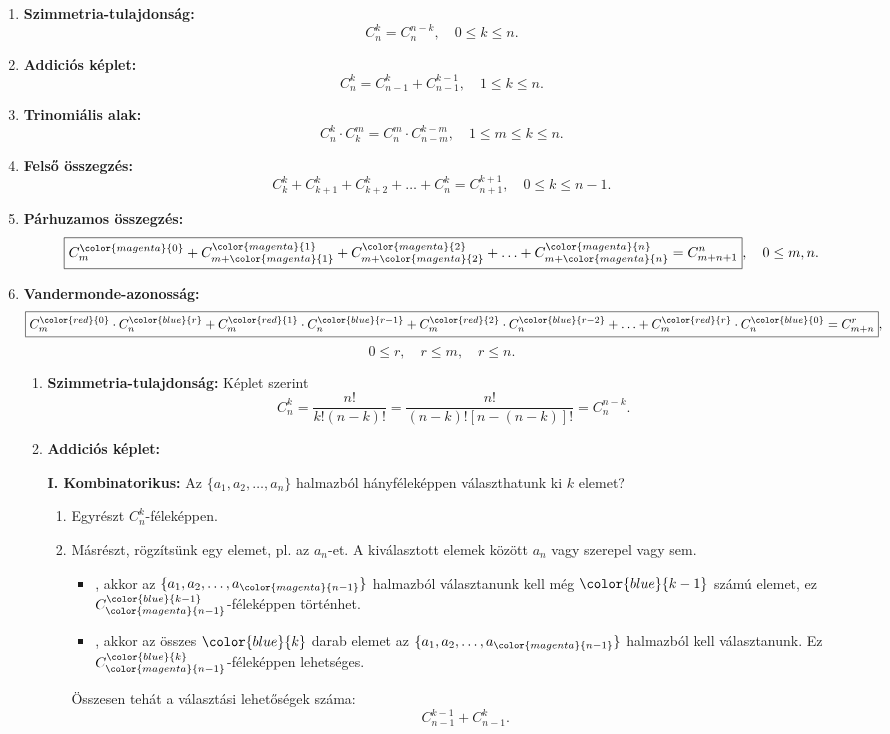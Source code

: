 \begin{enumerate}
\item \textbf{Szimmetria-tulajdonság:} 
\[
\boxed{C_{n}^{k}=C_{n}^{n-k}},\quad0\leq k\leq n.
\]
\item \textbf{Addiciós képlet:} 
\[
\boxed{C_{n}^{k}=C_{n-1}^{k}+C_{n-1}^{k-1}},\quad1\leq k\leq n.
\]
\item \textbf{Trinomiális alak:} 
\[
\boxed{C_{n}^{k}\cdot C_{k}^{m}=C_{n}^{m}\cdot C_{n-m}^{k-m}},\quad1\leq m\leq k\leq n.
\]
\item \textbf{Felső összegzés:} 
\[
\boxed{C_{k}^{k}+C_{k+1}^{k}+C_{k+2}^{k}+\ldots+C_{n}^{k}=C_{n+1}^{k+1}},\quad0\leq k\leq n-1.
\]
\item \textbf{Párhuzamos összegzés:} 
\[
\boxed{C_{m}^{{\color{magenta}{0}}}+C_{m+{\color{magenta}{1}}}^{{\color{magenta}{1}}}+C_{m+{\color{magenta}{2}}}^{{\color{magenta}{2}}}+\ldots+C_{m+{\color{magenta}{n}}}^{{\color{magenta}{n}}}=C_{m+n+1}^{n}},\quad0\leq m,n.
\]
\item \textbf{Vandermonde-azonosság:} 
\[
\boxed{C_{m}^{{\color{red}{0}}}\cdot C_{n}^{{\color{blue}{r}}}+C_{m}^{{\color{red}{1}}}\cdot C_{n}^{{\color{blue}{r-1}}}+C_{m}^{{\color{red}{2}}}\cdot C_{n}^{{\color{blue}{r-2}}}+\ldots+C_{m}^{{\color{red}{r}}}\cdot C_{n}^{{\color{blue}{0}}}=C_{m+n}^{r}},
\]
\[
0\leq r,\quad r\leq m,\quad r\leq n.
\]

\begin{enumerate}
\item \textbf{Szimmetria-tulajdonság:} Képlet szerint 
\[
C_{n}^{k}=\frac{n!}{k!(n-k)!}=\frac{n!}{(n-k)![n-(n-k)]!}=C_{n}^{n-k}.
\]
\item \textbf{Addiciós képlet:}

\textbf{I. Kombinatorikus:} Az $\{a_{1},a_{2},\dots,a_{n}\}$ halmazból
hányféleképpen választhatunk ki $k$ elemet? 
\begin{enumerate}
\item Egyrészt $C_{n}^{k}$-féleképpen. 
\item Másrészt, rögzítsünk egy elemet, pl. az $a_{n}$-et. A kiválasztott
elemek között $a_{n}$ vagy szerepel vagy sem. 
\begin{itemize}
\item {\color{ccqqqq}{Ha szerepel}}, akkor az $\{a_{1},a_{2},\dots,a_{{\color{magenta}{n-1}}}\}$
halmazból választanunk kell még ${\color{blue}{k-1}}$ számú elemet,
ez $C_{{\color{magenta}{n-1}}}^{{\color{blue}{k-1}}}$-féleképpen
történhet. 
\item {\color{ccqqqq}{Ha nem szerepel}}, akkor az összes ${\color{blue}{k}}$
darab elemet az $\{a_{1},a_{2},\dots,a_{{\color{magenta}{n-1}}}\}$
halmazból kell választanunk. Ez $C_{{\color{magenta}{n-1}}}^{{\color{blue}{k}}}$-féleképpen
lehetséges. 
\end{itemize}
Összesen tehát a választási lehetőségek száma: 
\[
C_{n-1}^{k-1}+C_{n-1}^{k}.
\]


\end{enumerate}
\end{enumerate}
\end{enumerate}
